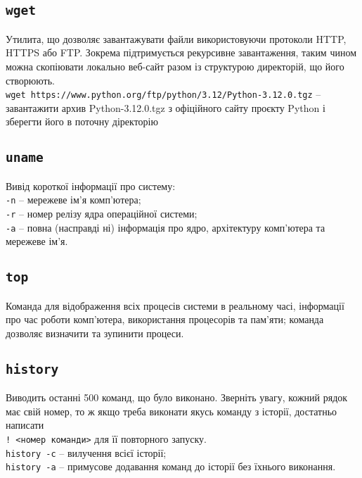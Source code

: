 \documentclass[10pt,a4paper]{fancyhandout}
\begin{document}
\subsection{\texttt{wget}}
Утилита, що дозволяє завантажувати файли використовуючи протоколи HTTP, HTTPS або FTP. Зокрема підтримується рекурсивне завантаження, таким чином можна скопіювати локально веб-сайт разом із структурою директорій, що його створюють. \\
\texttt{wget https://www.python.org/ftp/python/3.12/Python-3.12.0.tgz} -- завантажити архив Python-3.12.0.tgz з офіційного сайту проєкту Python і зберегти його в поточну діректорію
\goodbreak

\subsection{\texttt{uname}}
Вивід короткої інформації про систему: \\
\texttt{-n} -- мережеве ім'я комп'ютера; \\
\texttt{-r} -- номер релізу ядра операційної системи; \\
\texttt{-a} -- повна (насправді ні) інформація про ядро, архітектуру комп'ютера та мережеве ім'я.
\goodbreak

\subsection{\texttt{top}}
Команда для відображення всіх процесів системи в реальному часі, інформації про час роботи комп'ютера, використання процесорів та пам'яти; команда дозволяє визначити та зупинити процеси. 
\goodbreak

\subsection{\texttt{history}}
Виводить останні 500 команд, що було виконано. Зверніть увагу, кожний рядок має свій номер, то ж якщо треба виконати якусь команду з історії, достатньо написати \\
\texttt{! <номер команди>} для її повторного запуску. \\
\texttt{history -c} -- вилучення всієї історії; \\
\texttt{history -a} -- примусове додавання команд до історії без їхнього виконання.
\goodbreak
\end{document}
